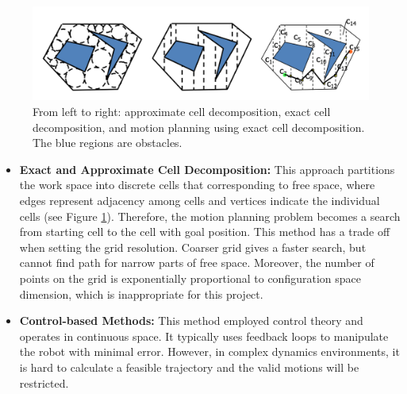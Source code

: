 \begin{figure}[H]
\centering
\includegraphics[width = \columnwidth]{background/cell.png}
\caption{From left to right: approximate cell decomposition, exact cell decomposition, and motion planning using exact cell decomposition. The blue regions are obstacles. \citep{celldecom}}
\label{cell}
\end{figure}

\begin{itemize}
    \item \textbf{Exact and Approximate Cell Decomposition:} This approach partitions the work space into discrete cells that corresponding to free space, where edges represent adjacency among cells and vertices indicate the individual cells (see Figure \ref{cell}). Therefore, the motion planning problem becomes a search from starting cell to the cell with goal position. This method has a trade off when setting the grid resolution. Coarser grid gives a faster search, but cannot find path for narrow parts of free space. Moreover, the number of points on the grid is exponentially proportional to configuration space dimension, which is inappropriate for this project.

    \item \textbf{Control-based Methods:} This method employed control theory and operates in continuous space. It typically uses feedback loops to manipulate the robot with minimal error. However, in complex dynamics environments, it is hard to calculate a feasible trajectory and the valid motions will be restricted.
\end{itemize}

